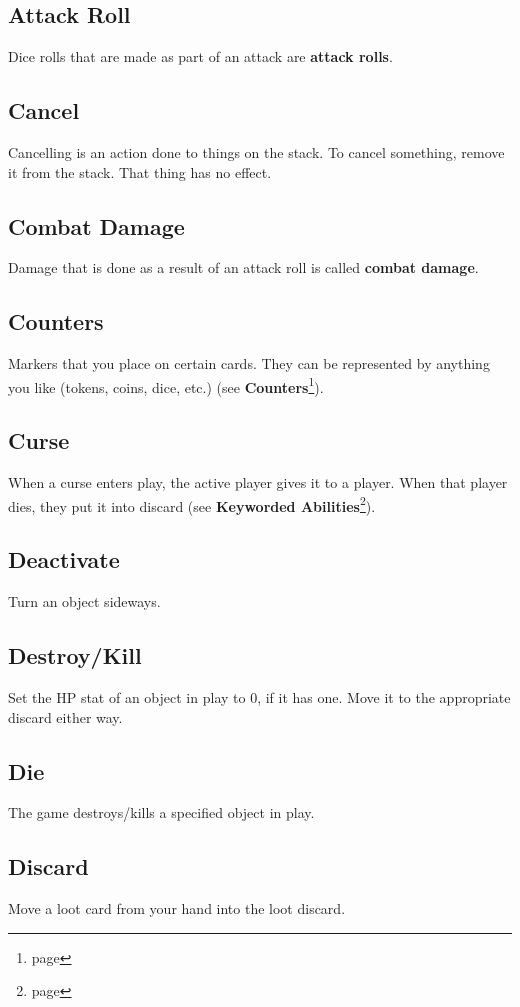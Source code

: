 \documentclass[a4paper, twoside]{report} %
\begin{document}
    \subsection*{Attack Roll}
    Dice rolls that are made as part of an attack are \textbf{attack rolls}.
    \subsection*{Cancel}
    Cancelling is an action done to things on the stack. To cancel something, remove it from the stack. That thing has no effect.
    \subsection*{Combat Damage}
    Damage that is done as a result of an attack roll is called \textbf{combat damage}.
    \subsection*{Counters}
    Markers that you place on certain cards. They can be represented by anything you like (tokens, coins, dice, etc.) (see \textbf{Counters}\footnote{page \pageref{counters}}).
    \subsection*{Curse}
    When a curse enters play, the active player gives it to a player. When that player dies, they put it into discard (see \textbf{Keyworded Abilities}\footnote{page \pageref{keyworded}}).
    \subsection*{Deactivate}
    Turn an object sideways.
    \subsection*{Destroy/Kill}
    Set the HP stat of an object in play to 0, if it has one. Move it to the appropriate discard either way.
    \subsection*{Die}
    The game destroys/kills a specified object in play.
    \subsection*{Discard}
    Move a loot card from your hand into the loot discard.
\end{document}
